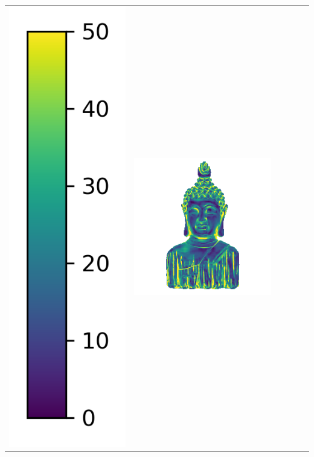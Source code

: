 \begin{tabularx}{\linewidth}{@{}Y@{}Y@{}Y@{}Y@{}Y@{}Y@{}}
\includegraphics[width=0.2\linewidth]{semisynthetic/colorbar_error_vertical.png} &
\includegraphics[width=\linewidth]{semisynthetic/20150514_16_ours_err.png} &

\end{tabularx}
